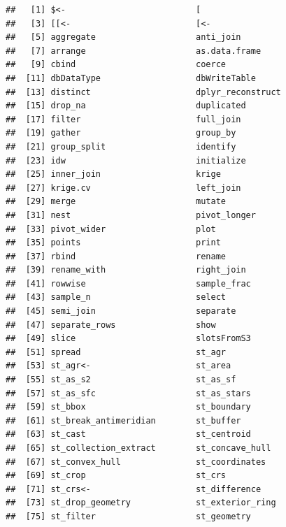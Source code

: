 \documentclass[
]{book}
\theoremstyle{break}
\theoremstyle{definition}
\theoremstyle{definition}
\theoremstyle{definition}
\theoremstyle{definition}
\theoremstyle{remark}
\begin{document}
\begin{verbatim}
##   [1] $<-                          [                           
##   [3] [[<-                         [<-                         
##   [5] aggregate                    anti_join                   
##   [7] arrange                      as.data.frame               
##   [9] cbind                        coerce                      
##  [11] dbDataType                   dbWriteTable                
##  [13] distinct                     dplyr_reconstruct           
##  [15] drop_na                      duplicated                  
##  [17] filter                       full_join                   
##  [19] gather                       group_by                    
##  [21] group_split                  identify                    
##  [23] idw                          initialize                  
##  [25] inner_join                   krige                       
##  [27] krige.cv                     left_join                   
##  [29] merge                        mutate                      
##  [31] nest                         pivot_longer                
##  [33] pivot_wider                  plot                        
##  [35] points                       print                       
##  [37] rbind                        rename                      
##  [39] rename_with                  right_join                  
##  [41] rowwise                      sample_frac                 
##  [43] sample_n                     select                      
##  [45] semi_join                    separate                    
##  [47] separate_rows                show                        
##  [49] slice                        slotsFromS3                 
##  [51] spread                       st_agr                      
##  [53] st_agr<-                     st_area                     
##  [55] st_as_s2                     st_as_sf                    
##  [57] st_as_sfc                    st_as_stars                 
##  [59] st_bbox                      st_boundary                 
##  [61] st_break_antimeridian        st_buffer                   
##  [63] st_cast                      st_centroid                 
##  [65] st_collection_extract        st_concave_hull             
##  [67] st_convex_hull               st_coordinates              
##  [69] st_crop                      st_crs                      
##  [71] st_crs<-                     st_difference               
##  [73] st_drop_geometry             st_exterior_ring            
##  [75] st_filter                    st_geometry                 

\end{verbatim}
\end{document}
